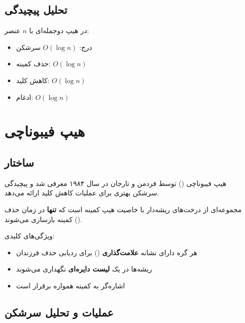 \documentclass{matinbook}
\begin{document}
    \subsection{تحلیل پیچیدگی}
    
    \begin{theorem}
        در هیپ دوجمله‌ای با $n$ عنصر:
        \begin{itemize}
            \item درج: $O(\log n)$ سرشکن
            \item حذف کمینه: $O(\log n)$
            \item کاهش کلید: $O(\log n)$
            \item ادغام: $O(\log n)$
        \end{itemize}
        \label{thm:binomial-complexity}
    \end{theorem}
    
    \section{هیپ فیبوناچی}
    
    \subsection{ساختار}
    
    هیپ فیبوناچی
    () توسط فردمن و تارجان
    در سال ۱۹۸۴ معرفی شد و پیچیدگی سرشکن
    بهتری برای عملیات کاهش کلید ارائه می‌دهد.
    
    \begin{definition}
        مجموعه‌ای از درخت‌های ریشه‌دار
        با خاصیت هیپ کمینه است که
        \textbf{تنها} در زمان حذف کمینه
        بازسازی می‌شوند ().
        \label{def:fibonacci-heap}
    \end{definition}
    
    ویژگی‌های کلیدی:
    \begin{itemize}
        \item هر گره دارای نشانه \textbf{علامت‌گذاری}
        () برای ردیابی حذف فرزندان
        \item ریشه‌ها در یک \textbf{لیست دایره‌ای}
        نگهداری می‌شوند
        \item اشاره‌گر به کمینه همواره برقرار است
    \end{itemize}
    
    \subsection{عملیات و تحلیل سرشکن}
    
\end{document}
